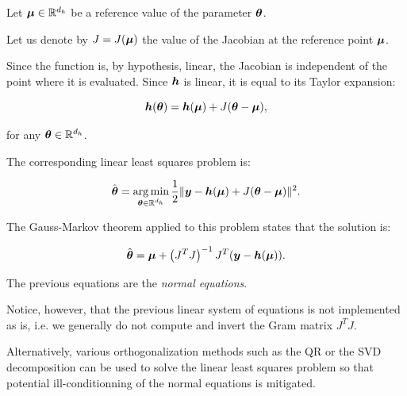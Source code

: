 \documentclass{beamer}
\begin{document}

\begin{frame}
Let $\boldsymbol{\mu} \in \mathbb{R}^{d_h}$ be a reference value of the
parameter $\boldsymbol{\theta}$. 

Let us denote by $J=J(\boldsymbol{\mu})$ the value of the Jacobian at the reference point
$\boldsymbol{\mu}$. 

Since the function is, by hypothesis, linear, the
Jacobian is independent of the point where it is evaluated. Since
$\boldsymbol{h}$ is linear, it is equal to its Taylor expansion:

$$
       \boldsymbol{h}(\boldsymbol{\theta}) = \boldsymbol{h}(\boldsymbol{\mu}) + J (\boldsymbol{\theta} - \boldsymbol{\mu}),
$$

for any $\boldsymbol{\theta} \in \mathbb{R}^{d_h}$.

\end{frame}


\begin{frame}
The corresponding linear least squares problem is:

$$
       \hat{\boldsymbol{\theta}} = \operatorname*{arg\,min}_{\boldsymbol{\theta} \in \mathbb{R}^{d_h}} \frac{1}{2} \|\boldsymbol{y} - \boldsymbol{h}(\boldsymbol{\mu}) + J (\boldsymbol{\theta} - \boldsymbol{\mu})\|^2.
$$

The Gauss-Markov theorem applied to this problem states that the
solution is:

$$
       \hat{\boldsymbol{\theta}} = \boldsymbol{\mu} + \left(J^T J\right)^{-1} J^T ( \boldsymbol{y} - \boldsymbol{h}(\boldsymbol{\mu})).
$$

\end{frame}


\begin{frame}
The previous equations are the \emph{normal equations}. 

Notice, however, that the previous linear system of equations 
is not implemented as is, i.e.
we generally do not compute and invert the Gram matrix $J^T J$.

Alternatively, various orthogonalization methods such as the QR or the
SVD decomposition can be used to solve the linear least squares problem
so that potential ill-conditionning of the normal equations is
mitigated.

\end{frame}
\end{document}
